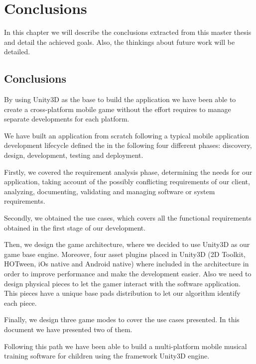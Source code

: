 \chapter{Conclusions}
\label{chap:conclusions}
\begin{chapterintro}
In this chapter we will describe the conclusions extracted from this master thesis and detail the achieved goals. Also, the thinkings about future work will be detailed.
\end{chapterintro}

\cleardoublepage
\section{Conclusions}

By using Unity3D as the base to build the application we have been able to create a cross-platform mobile game without the effort requires to manage separate developments for each platform.

We have built an application from scratch following a typical mobile application development lifecycle defined the in the following four different phases: discovery, design, development, testing and deployment.~\cite{vithani2014mod}

Firstly, we covered the requirement analysis phase, determining the needs for our application, taking account of the possibly conflicting requirements of our client, analyzing, documenting, validating and managing software or system requirements.~\cite{kotonya1998requirements}

Secondly, we obtained the use cases, which covers all the functional requirements obtained in the first stage of our development.

Then, we design the game architecture, where we decided to use Unity3D as our game base engine. Moreover, four asset plugins placed in Unity3D (2D Toolkit, HOTween, iOs native and Android native) where included in the architecture in order to improve performance and make the development easier. Also we need to design physical pieces to let the gamer interact with the software application. This pieces have a unique base pads distribution to let our algorithm identify each piece.

Finally, we design three game modes to cover the use cases presented. In this document we have presented two of them.

Following this path we have been able to build a multi-platform mobile musical training software for children using the framework Unity3D engine.

